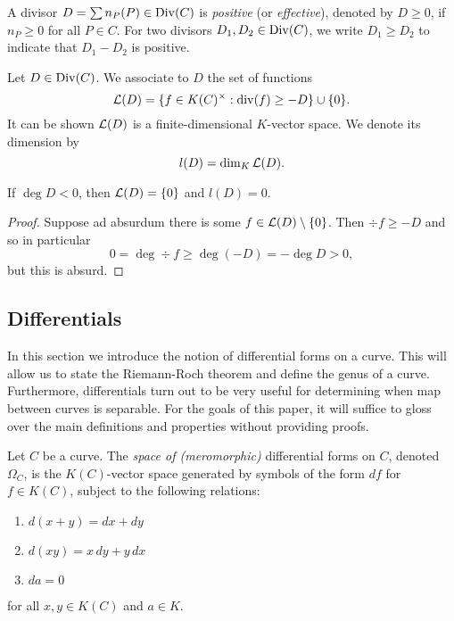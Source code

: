 \begin{definition}
	A divisor $D = \sum n_P(P) \in \operatorname{Div}(C)$ is \emph{positive} (or
	\emph{effective}), denoted by
	$D \geq 0$, if $n_P \geq 0$ for all $P \in C$.
	For two divisors $D_1, D_2 \in \operatorname{Div}(C)$, we write $D_1 \geq D_2$
	to indicate that $D_1 - D_2$ is positive.
\end{definition}

\begin{definition}
	Let $D \in \operatorname{Div}(C)$. We associate to $D$ the set of functions
	\begin{equation*}
		\mathcal{L}(D) = \{f \in K(C)^\times: \operatorname{div}(f) \geq -D\} \cup \{ 0 \}.
	\end{equation*}
	It can be shown $\mathcal{L}(D)$ is a finite-dimensional
	$K$-vector space. We denote its dimension by
	\begin{equation*}
		l(D) = \dim_K \mathcal{L}(D).
	\end{equation*}
\end{definition}

\begin{proposition}
	\label{prop:L-prop}
	If $\deg D < 0$, then $\mathcal{L}(D) = \{0\}$ and $l(D) = 0$.
\end{proposition}

\begin{proof}
	Suppose ad absurdum there is some $f \in \mathcal{L}(D) \setminus \{0\}$.
	Then $\div f \geq -D$ and so in particular
	\begin{equation*}
		0 = \deg \div f \geq \deg(-D) = -\deg D > 0,
	\end{equation*}
	but this is absurd.
\end{proof}

\subsection{Differentials}

In this section we introduce the notion of differential forms on a curve.
This will allow us to state the Riemann-Roch theorem and define the genus of a
curve. Furthermore, differentials turn out to be very useful for determining
when map between curves is separable.
For the goals of this paper, it will suffice to gloss over the main definitions
and properties without providing proofs.

\begin{definition}
	Let $C$ be a curve. 
	The \emph{space of (meromorphic)} differential forms on $C$, denoted
	$\Omega_C$, is the $K(C)$-vector space generated by symbols of the form
	$df$ for $f\in K(C)$, subject to the following relations:
	\begin{enumerate}[itemsep=0em]
		\item $d(x + y) = dx + dy$
		\item $d(xy) = x\,dy + y\,dx$
		\item $da = 0$
	\end{enumerate}
	for all $x, y \in K(C)$ and $a \in K$.
\end{definition}

